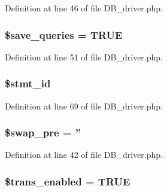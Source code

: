 Definition at line 46 of file D\-B\-\_\-driver.\-php.

\hypertarget{class_c_i___d_b__driver_a083a278ea2075824db1db85edaa8e0a8}{
\subsubsection[{\$save\-\_\-queries}]{\setlength{\rightskip}{0pt plus 5cm}\$save\-\_\-queries = T\-R\-U\-E}}\label{class_c_i___d_b__driver_a083a278ea2075824db1db85edaa8e0a8}


Definition at line 51 of file D\-B\-\_\-driver.\-php.

\hypertarget{class_c_i___d_b__driver_a1a97f17fd259cd27c73b65e6c3706ec0}{
\subsubsection[{\$stmt\-\_\-id}]{\setlength{\rightskip}{0pt plus 5cm}\$stmt\-\_\-id}}\label{class_c_i___d_b__driver_a1a97f17fd259cd27c73b65e6c3706ec0}


Definition at line 69 of file D\-B\-\_\-driver.\-php.

\hypertarget{class_c_i___d_b__driver_a913c5a5af0c805fe64f884af6028fb73}{
\subsubsection[{\$swap\-\_\-pre}]{\setlength{\rightskip}{0pt plus 5cm}\$swap\-\_\-pre = ''}}\label{class_c_i___d_b__driver_a913c5a5af0c805fe64f884af6028fb73}


Definition at line 42 of file D\-B\-\_\-driver.\-php.

\hypertarget{class_c_i___d_b__driver_a450683d6d87929985766484b2f6a9e7b}{
\subsubsection[{\$trans\-\_\-enabled}]{\setlength{\rightskip}{0pt plus 5cm}\$trans\-\_\-enabled = T\-R\-U\-E}}\label{class_c_i___d_b__driver_a450683d6d87929985766484b2f6a9e7b}


